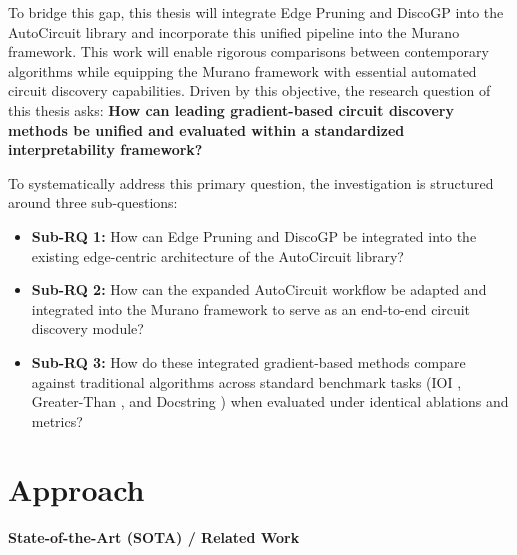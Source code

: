\documentclass[
    IMRAD=false,
	english,
	ruledheaders=section, %
	class=report, %
	thesis={type=bachelor}, %
	accentcolor=9c, %
	custommargins=false,%
	marginpar=false,%
	parskip=half,%
	fontsize=11pt,%
]{tudapub}
\begin{document}
To bridge this gap, this thesis will integrate Edge Pruning and DiscoGP into the AutoCircuit library and incorporate this unified pipeline into the Murano framework. This work will enable rigorous comparisons between contemporary algorithms while equipping the Murano framework with essential automated circuit discovery capabilities. Driven by this objective, the research question of this thesis asks: \textbf{How can leading gradient-based circuit discovery methods be unified and evaluated within a standardized interpretability framework?}

To systematically address this primary question, the investigation is structured around three sub-questions:

\begin{itemize}
    \item \textbf{Sub-RQ 1:} How can Edge Pruning and  DiscoGP be integrated into the existing edge-centric architecture of the AutoCircuit library?
    \item \textbf{Sub-RQ 2:} How can the expanded AutoCircuit workflow be adapted and integrated into the Murano framework to serve as an end-to-end circuit discovery module?
    \item \textbf{Sub-RQ 3:} How do these integrated gradient-based methods compare against traditional algorithms across standard benchmark tasks (IOI \citep{wang2023interpretability}, Greater-Than \citep{hanna2023doesgpt2computegreaterthan}, and Docstring \citep{stefanhex_janiak_2023}) when evaluated under identical ablations and metrics?
\end{itemize}

\chapter{Approach}\label{approach}
\newcommand{\miniheader}[1]{\vspace{0.5em}\noindent\textbf{\Large\textsf{#1}}\par\vspace{0.5em}} %

\miniheader{State-of-the-Art (SOTA) / Related Work}
\end{document}
